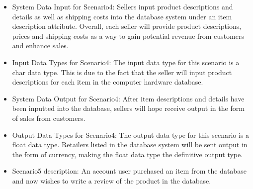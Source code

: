 {\begin{itemize}
\begin{itemize}
\begin{itemize}
	Another real world scenario a seller user type can act out within the database environment involves the interaction between seller and account-only customers. As compared to guest users, account customers are allowed increased access to seller and product information. For example: A seller user type can add new products to their inventory. More inventory has a probable chance to lead to more potential customers. If an account customer decides to buy a product a seller is retailing, the seller will receive the amounted price on the specific item from the customer. This retailer-customer relationship and interaction is necessary in order to keep business operations flowing at a normal rate.  If the connection between seller and account-customer is not made through the description of well defined products, the seller user type will find it very difficult to keep its business in check and ultimately loose ties with customers and manufactures as a whole. By constantly adding and updating information by interacting with the computer hardware database, sellers can easily access their inventory while account-customers can simply read, redeem and rate said inventory, leading to future healthy connections between seller and account-customers.
	\item{System Data Input for Scenario4: }
	Sellers input product descriptions and details as well as shipping costs into the database system under an item description attribute. Overall, each seller will provide product descriptions, prices and shipping costs as a way to gain potential revenue from customers and enhance sales. 
	\item{Input Data Types for Scenario4: }
	The input data type for this scenario is a char data type. This is due to the fact that the seller will input product descriptions for each item in the computer hardware database. 
	\item{System Data Output for Scenario4: }
	After item descriptions and details have been inputted into the database, sellers will hope receive output in the form of sales from customers. 
	\item{Output Data Types for Scenario4: }
	The output data type for this scenario is a float data type. Retailers listed in the database system will be sent output in the form of currency, making the float data type the definitive output type. 
	\end{itemize}
	\begin{itemize} 
	\item{Scenario5 description: }
	An account user purchased an item from the database and now wishes to write a review  of the product in the database. 

\end{itemize}
\end{itemize}
\end{itemize}}
